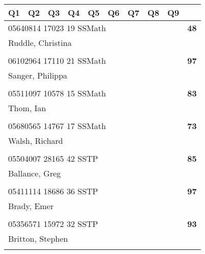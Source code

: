 \documentclass[a4paper,12pt]{article}
\begin{document}
\begin{tabular}{
   |p{9mm}|
    p{9mm}|
    p{9mm}|
    p{9mm}|
    p{9mm}|
    p{9mm}|
    p{9mm}|
    p{9mm}|
    p{9mm}|
    p{9mm}|}
\hline\hline
Q1 & Q2 & Q3 & Q4 & Q5 & Q6 & Q7 & Q8 & Q9 &     \\
\hline\hline
\multicolumn{9}{|l|}{05640814 17023 19 SSMath} & \textbf{48} \\
\hline
\multicolumn{10}{|l|}{Ruddle, Christina} \\
\hline
   \vrule height8mm width0pt depth2mm 
      &    &    &    &    &    &    &    &    &     \\
\hline\hline
\multicolumn{9}{|l|}{06102964 17110 21 SSMath} & \textbf{97} \\
\hline
\multicolumn{10}{|l|}{Sanger, Philippa} \\
\hline
   \vrule height8mm width0pt depth2mm 
      &    &    &    &    &    &    &    &    &     \\
\hline\hline
\multicolumn{9}{|l|}{05511097 10578 15 SSMath} & \textbf{83} \\
\hline
\multicolumn{10}{|l|}{Thom, Ian} \\
\hline
   \vrule height8mm width0pt depth2mm 
      &    &    &    &    &    &    &    &    &     \\
\hline\hline
\multicolumn{9}{|l|}{05680565 14767 17 SSMath} & \textbf{73} \\
\hline
\multicolumn{10}{|l|}{Walsh, Richard} \\
\hline
   \vrule height8mm width0pt depth2mm 
      &    &    &    &    &    &    &    &    &     \\
\hline\hline
\multicolumn{9}{|l|}{05504007 28165 42 SSTP} & \textbf{85} \\
\hline
\multicolumn{10}{|l|}{Ballance, Greg} \\
\hline
   \vrule height8mm width0pt depth2mm 
      &    &    &    &    &    &    &    &    &     \\
\hline\hline
\multicolumn{9}{|l|}{05411114 18686 36 SSTP} & \textbf{97} \\
\hline
\multicolumn{10}{|l|}{Brady, Emer} \\
\hline
   \vrule height8mm width0pt depth2mm 
      &    &    &    &    &    &    &    &    &     \\
\hline\hline
\multicolumn{9}{|l|}{05356571 15972 32 SSTP} & \textbf{93} \\
\hline
\multicolumn{10}{|l|}{Britton, Stephen} \\
\hline
   \vrule height8mm width0pt depth2mm 

\end{tabular}
\end{document}
